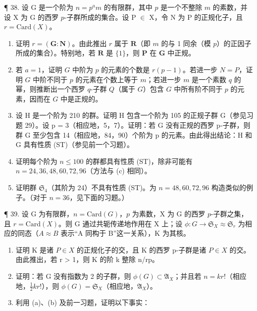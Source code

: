 ¶ 38. 设 G 是一个阶为 \(n = p^{a}m\) 的有限群，其中 \(p\) 是一个不整除 \(m\) 的素数，并设 X 为 G 的西罗 \(p\)-子群所成的集合。设 P \ensuremath{\in} X，令 N 为 P 的正规化子，且 \(r = \text{Card}(X)\)。

\begin{enumerate}
\def\labelenumi{(\alph{enumi})}
\item
  证明 \(r = (\mathbf{G}:\mathbf{N})\)。由此推出 \(r\) 属于 \(\mathbf{R}\)（即 \(m\) 的与 1 同余（模 \(p\)）的正因子所成的集合）。特别地，若 \(\mathbf{R}\) 是 \(\{1\}\)，则 \(\mathbf{P}\) 在 \(\mathbf{G}\) 中正规。
\item
  若 \(a = 1\)，证明 \(G\) 中阶为 \(p\) 的元素的个数是 \(r(p - 1)\)。若进一步 \(N = P\)，证明 \(G\) 中阶不同于 \(p\) 的元素在个数上等于 \(m\)；若进一步 \(m\) 是一个素数 \(q\) 的幂，则推断出一个西罗 \(q\)-子群 \(Q\)（属于 \(G\)）包含 \(G\) 中所有阶不同于 \(p\) 的元素，因而在 \(G\) 中是正规的。
\item
  设 H 是一个阶为 210 的群。证明 H 包含一个阶为 105 的正规子群 G（参见习题 29）。设 p = 3（相应地，5，7）。证明：若 G 没有正规的西罗 p-子群，则群 G 至少包含 14（相应地，84，90）个阶为 p 的元素。由此得出结论：H 和 G 具有性质 (ST)（参见前一个习题）。
\item
  证明每个阶为 \(n \leqslant 100\) 的群都具有性质 (ST)，除非可能有 \(n = 24, 36, 48, 60, 72, 96\)（方法与 (c) 相同）。
\item
  证明群 \(\mathfrak{S}_4\)（其阶为 24）不具有性质 (ST)。为 \(n = 48, 60, 72, 96\) 构造类似的例子。（对于 \(n = 36\)，见下面的习题。）
\end{enumerate}

¶ 39. 设 G 为有限群，\(n = \text{Card}(G)\)，\(p\) 为素数，X 为 G 的西罗 \(p\)-子群之集，且 \(r = \text{Card}(X)\)。则 G 通过共轭传递地作用在 X 上；设 \(\phi: G \to \mathfrak{S}_{X} \approx \mathfrak{S}_r\) 为相应的同态（\(A \approx B\) 表示“A 同构于 B”这一关系），K 为其核。

\begin{enumerate}
\def\labelenumi{(\alph{enumi})}
\item
  证明 K 是诸 \(P \in X\) 的正规化子的交，且 K 的西罗 p-子群是诸 \(P \in X\) 的交。由此推出，若 r \textgreater{} 1，则 K 的阶 k 整除 n/rp。
\item
  证明：若 G 没有指数为 2 的子群，则 \(\phi(G) \subset \mathfrak{A}_{X}\)；并且若 \(n = kr!\)（相应地，\(\frac{1}{2}kr!\)），则 \(\phi(G) = \mathfrak{S}_{X}\)（相应地，\(\mathfrak{A}_{X}\)）。
\item
  利用 (a)、(b) 及前一习题，证明以下事实：
\end{enumerate}

